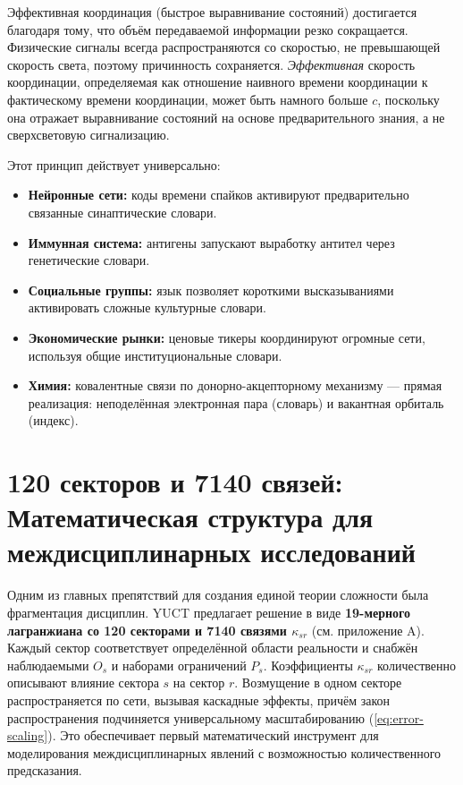 \documentclass[11pt]{article}
\theoremstyle{remark}
\begin{document}
	Эффективная координация (быстрое выравнивание состояний) достигается благодаря тому, что объём передаваемой информации резко сокращается. Физические сигналы всегда распространяются со скоростью, не превышающей скорость света, поэтому причинность сохраняется. \emph{Эффективная} скорость координации, определяемая как отношение наивного времени координации к фактическому времени координации, может быть намного больше \(c\), поскольку она отражает выравнивание состояний на основе предварительного знания, а не сверхсветовую сигнализацию.
	
	Этот принцип действует универсально:
	\begin{itemize}
		\item \textbf{Нейронные сети:} коды времени спайков активируют предварительно связанные синаптические словари.
		\item \textbf{Иммунная система:} антигены запускают выработку антител через генетические словари.
		\item \textbf{Социальные группы:} язык позволяет короткими высказываниями активировать сложные культурные словари.
		\item \textbf{Экономические рынки:} ценовые тикеры координируют огромные сети, используя общие институциональные словари.
		\item \textbf{Химия:} ковалентные связи по донорно-акцепторному механизму — прямая реализация: неподелённая электронная пара (словарь) и вакантная орбиталь (индекс).
	\end{itemize}
	
	\section{120 секторов и 7140 связей: Математическая структура для междисциплинарных исследований}
	\label{sec:sectors}
	
	Одним из главных препятствий для создания единой теории сложности была фрагментация дисциплин. YUCT предлагает решение в виде \textbf{19-мерного лагранжиана со 120 секторами и 7140 связями \(\kappa_{sr}\)} (см. приложение A). Каждый сектор соответствует определённой области реальности и снабжён наблюдаемыми \(O_s\) и наборами ограничений \(P_s\). Коэффициенты \(\kappa_{sr}\) количественно описывают влияние сектора \(s\) на сектор \(r\). Возмущение в одном секторе распространяется по сети, вызывая каскадные эффекты, причём закон распространения подчиняется универсальному масштабированию (\ref{eq:error-scaling}). Это обеспечивает первый математический инструмент для моделирования междисциплинарных явлений с возможностью количественного предсказания.
	
\end{document}
